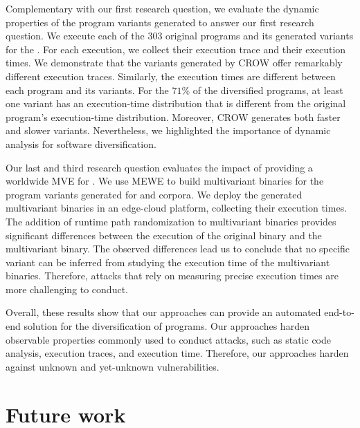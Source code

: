 Complementary with our first research question, we evaluate the dynamic properties of the program variants generated to answer our first research question.
We execute each of the 303 original programs and its generated variants for the \corpusrosetta.
For each execution, we collect their execution trace and their execution times.
We demonstrate that the \wasm variants generated by CROW offer remarkably different execution traces.
Similarly, the execution times are different between each program and its variants.
For the $71\%$ of the diversified programs, at least one variant has an execution-time distribution that is different from the original program's execution-time distribution.
Moreover, CROW generates both faster and slower variants.
Nevertheless, we highlighted the importance of dynamic analysis for software diversification. 

Our last and third research question evaluates the impact of providing a worldwide MVE for \wasm.
We use MEWE to build multivariant binaries for the program variants generated for \corpussodium and \corpusqrcode corpora.
We deploy the generated multivariant binaries in an edge-cloud platform, collecting their execution times.
The addition of runtime path randomization to multivariant binaries provides significant differences between the execution of the original binary and the multivariant binary.
The observed differences lead us to conclude that no specific variant can be inferred from studying the execution time of the multivariant binaries. Therefore, attacks that rely on measuring precise execution times are more challenging to conduct.


Overall, these results show that our approaches can provide an automated end-to-end solution for the diversification of \wasm programs. 
Our approaches harden observable properties commonly used to conduct attacks, such as static code analysis, execution traces, and execution time.
Therefore, our approaches harden \wasm against unknown and yet-unknown vulnerabilities.


\section{Future work}
\label{future_work}

